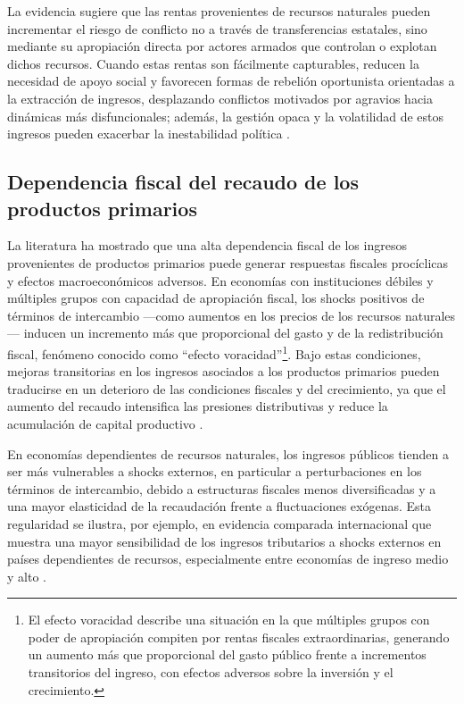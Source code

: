\documentclass[../../PTFM.tex]{subfiles}
\begin{document}
	La evidencia sugiere que las rentas provenientes de recursos naturales pueden incrementar el riesgo de conflicto no a través de transferencias estatales, sino mediante su apropiación directa por actores armados que controlan o explotan dichos recursos. Cuando estas rentas son fácilmente capturables, reducen la necesidad de apoyo social y favorecen formas de rebelión oportunista orientadas a la extracción de ingresos, desplazando conflictos motivados por agravios hacia dinámicas más disfuncionales; además, la gestión opaca y la volatilidad de estos ingresos pueden exacerbar la inestabilidad política \parencite{Coller2005}.
	
	\subsection{Dependencia fiscal del recaudo de los productos primarios}
	\label{subsec:dependencia-fiscal}
	
	La literatura ha mostrado que una alta dependencia fiscal de los ingresos provenientes de productos primarios puede generar respuestas fiscales procíclicas y efectos macroeconómicos adversos. En economías con instituciones débiles y múltiples grupos con capacidad de apropiación fiscal, los shocks positivos de términos de intercambio —como aumentos en los precios de los recursos naturales— inducen un incremento más que proporcional del gasto y de la redistribución fiscal, fenómeno conocido como “efecto voracidad”\footnote{El efecto voracidad describe una situación en la que múltiples grupos con poder de apropiación compiten por rentas fiscales extraordinarias, generando un aumento más que proporcional del gasto público frente a incrementos transitorios del ingreso, con efectos adversos sobre la inversión y el crecimiento.}. Bajo estas condiciones, mejoras transitorias en los ingresos asociados a los productos primarios pueden traducirse en un deterioro de las condiciones fiscales y del crecimiento, ya que el aumento del recaudo intensifica las presiones distributivas y reduce la acumulación de capital productivo \parencite{Tornell1999}.
	
	En economías dependientes de recursos naturales, los ingresos públicos tienden a ser más vulnerables a shocks externos, en particular a perturbaciones en los términos de intercambio, debido a estructuras fiscales menos diversificadas y a una mayor elasticidad de la recaudación frente a fluctuaciones exógenas. Esta regularidad se ilustra, por ejemplo, en evidencia comparada internacional que muestra una mayor sensibilidad de los ingresos tributarios a shocks externos en países dependientes de recursos, especialmente entre economías de ingreso medio y alto \parencite{vonHaldenwang2018}.
	
\end{document}
